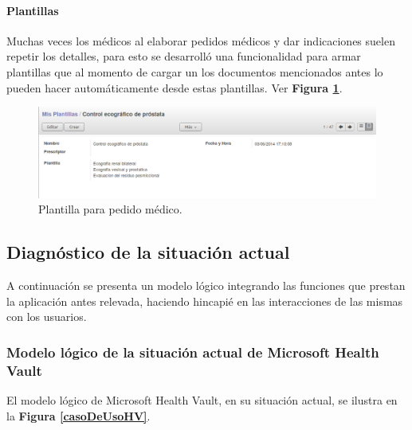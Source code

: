 \paragraph{Plantillas}

Muchas veces los médicos al elaborar pedidos médicos y dar indicaciones suelen repetir los detalles, para esto se desarrolló una funcionalidad para armar plantillas que al momento de cargar un los documentos mencionados antes lo pueden hacer automáticamente desde estas plantillas. Ver \textbf{Figura \ref{plantilla}}.


\begin{figure}[h]
      \centering
      \includegraphics[width=.8\textwidth]{img/tp1/HE/PlantillaPM}
      \caption{Plantilla para pedido médico.}
      \label{plantilla}
\end{figure}

\subsection{Diagnóstico de la situación actual}
A continuación se presenta un modelo lógico integrando las funciones que prestan la aplicación antes relevada, haciendo hincapié en las interacciones de las mismas con los usuarios.


\subsubsection{Modelo lógico de la situación actual de Microsoft Health Vault}

El modelo lógico de Microsoft Health Vault, en su situación actual, se ilustra en la \textbf{Figura \ref{casoDeUsoHV}}.

